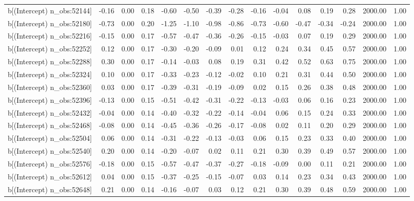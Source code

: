 \begin{table}[ht]
\begin{tabular}{rrrrrrrrrrrrrrr}
  b[(Intercept) n\_obs:52144] & -0.16 & 0.00 & 0.18 & -0.60 & -0.50 & -0.39 & -0.28 & -0.16 & -0.04 & 0.08 & 0.19 & 0.28 & 2000.00 & 1.00 \\ 
  b[(Intercept) n\_obs:52180] & -0.73 & 0.00 & 0.20 & -1.25 & -1.10 & -0.98 & -0.86 & -0.73 & -0.60 & -0.47 & -0.34 & -0.24 & 2000.00 & 1.00 \\ 
  b[(Intercept) n\_obs:52216] & -0.15 & 0.00 & 0.17 & -0.57 & -0.47 & -0.36 & -0.26 & -0.15 & -0.03 & 0.07 & 0.19 & 0.29 & 2000.00 & 1.00 \\ 
  b[(Intercept) n\_obs:52252] & 0.12 & 0.00 & 0.17 & -0.30 & -0.20 & -0.09 & 0.01 & 0.12 & 0.24 & 0.34 & 0.45 & 0.57 & 2000.00 & 1.00 \\ 
  b[(Intercept) n\_obs:52288] & 0.30 & 0.00 & 0.17 & -0.14 & -0.03 & 0.08 & 0.19 & 0.31 & 0.42 & 0.52 & 0.63 & 0.75 & 2000.00 & 1.00 \\ 
  b[(Intercept) n\_obs:52324] & 0.10 & 0.00 & 0.17 & -0.33 & -0.23 & -0.12 & -0.02 & 0.10 & 0.21 & 0.31 & 0.44 & 0.50 & 2000.00 & 1.00 \\ 
  b[(Intercept) n\_obs:52360] & 0.03 & 0.00 & 0.17 & -0.39 & -0.31 & -0.19 & -0.09 & 0.02 & 0.15 & 0.26 & 0.38 & 0.48 & 2000.00 & 1.00 \\ 
  b[(Intercept) n\_obs:52396] & -0.13 & 0.00 & 0.15 & -0.51 & -0.42 & -0.31 & -0.22 & -0.13 & -0.03 & 0.06 & 0.16 & 0.23 & 2000.00 & 1.00 \\ 
  b[(Intercept) n\_obs:52432] & -0.04 & 0.00 & 0.14 & -0.40 & -0.32 & -0.22 & -0.14 & -0.04 & 0.06 & 0.15 & 0.24 & 0.33 & 2000.00 & 1.00 \\ 
  b[(Intercept) n\_obs:52468] & -0.08 & 0.00 & 0.14 & -0.45 & -0.36 & -0.26 & -0.17 & -0.08 & 0.02 & 0.11 & 0.20 & 0.29 & 2000.00 & 1.00 \\ 
  b[(Intercept) n\_obs:52504] & 0.06 & 0.00 & 0.14 & -0.31 & -0.22 & -0.13 & -0.03 & 0.06 & 0.15 & 0.23 & 0.33 & 0.40 & 2000.00 & 1.00 \\ 
  b[(Intercept) n\_obs:52540] & 0.20 & 0.00 & 0.14 & -0.20 & -0.07 & 0.02 & 0.11 & 0.21 & 0.30 & 0.39 & 0.49 & 0.57 & 2000.00 & 1.00 \\ 
  b[(Intercept) n\_obs:52576] & -0.18 & 0.00 & 0.15 & -0.57 & -0.47 & -0.37 & -0.27 & -0.18 & -0.09 & 0.00 & 0.11 & 0.21 & 2000.00 & 1.00 \\ 
  b[(Intercept) n\_obs:52612] & 0.04 & 0.00 & 0.15 & -0.37 & -0.25 & -0.15 & -0.07 & 0.03 & 0.14 & 0.23 & 0.34 & 0.43 & 2000.00 & 1.00 \\ 
  b[(Intercept) n\_obs:52648] & 0.21 & 0.00 & 0.14 & -0.16 & -0.07 & 0.03 & 0.12 & 0.21 & 0.30 & 0.39 & 0.48 & 0.59 & 2000.00 & 1.00 \\ 

\end{tabular}
\end{table}
